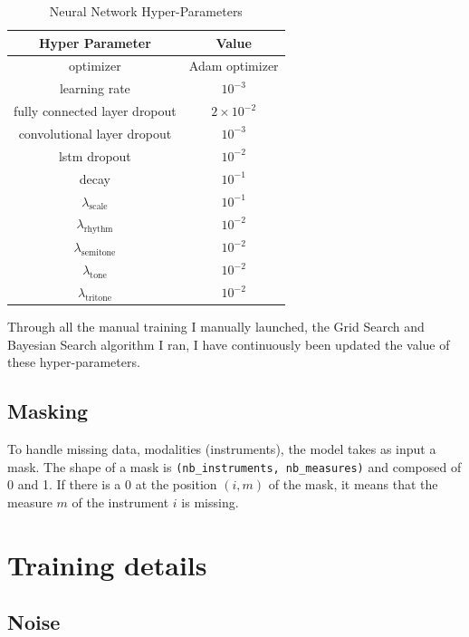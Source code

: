 \documentclass[12pt]{report}
\begin{document}
\begin{table}[]
    \centering
    \begin{tabular}{c|c}
        Hyper Parameter & Value \\
        \hline
        optimizer &  Adam optimizer \cite{brownlee_gentle_2017, bushaev_adam_2018, kingma_adam_2017} \\
        learning rate & $10^{-3}$ \\
        fully connected layer dropout & $2 \times 10^{-2}$ \\
        convolutional layer dropout & $10^{-3}$ \\
        lstm dropout & $10^{-2}$ \\
        decay & $10^{-1}$ \\
        $\lambda_{\text{scale}}$ & $10^{-1}$ \\
        $\lambda_{\text{rhythm}}$ & $10^{-2}$ \\
        $\lambda_{\text{semitone}}$ & $10^{-2}$ \\
        $\lambda_{\text{tone}}$ & $10^{-2}$ \\
        $\lambda_{\text{tritone}}$ & $10^{-2}$ \\
    \end{tabular}
    \caption{Neural Network Hyper-Parameters}
    \label{tab:network-hp}
\end{table}

Through all the manual training I manually launched, the Grid Search and Bayesian Search algorithm I ran, I have continuously been updated the value of these hyper-parameters.

\subsection{Masking}

To handle missing data, modalities (instruments), the model takes as input a mask.
The shape of a mask is \texttt{(nb\_instruments, nb\_measures)} and composed of 0 and 1.
If there is a 0 at the position $(i, m)$ of the mask, it means that the measure $m$ of the instrument $i$ is missing.


\section{Training details}

\subsection{Noise}
\end{document}

